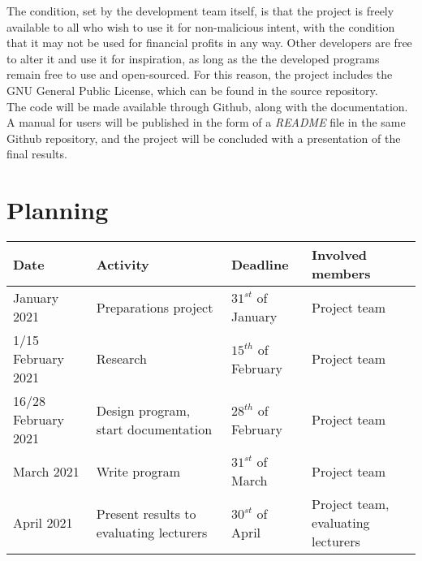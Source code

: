 \documentclass[a4paper,12pt]{article}
\begin{document}
The condition, set by the development team itself, is that the project is freely available to all who wish to use it for non-malicious intent, with the condition that it may not be used for financial profits in any way. Other developers are free to alter it and use it for inspiration, as long as the the developed programs remain free to use and open-sourced. For this reason, the project includes the GNU General Public License, which can be found in the source repository.\\

The code will be made available through Github, along with the documentation. A manual for users will be published in the form of a \textit{README} file in the same Github repository, and the project will be concluded with a presentation of the final results.

\section{Planning}

\begin{center}
  \begin{tabular}{||m{2cm} || m{4cm} || m{3cm} || m{3.5cm}||} 
    \hline
    Date & Activity & Deadline & Involved members \\ [0.5ex] 
    \hline\hline
    January 2021 & Preparations project & $31^{st}$ of January & Project team \\ 
    \hline
    1/15 February 2021 & Research & $15^{th}$ of February & Project team \\
    \hline
    16/28 February 2021 & Design program, start documentation & $28^{th}$ of February & Project team \\
    \hline
    March 2021 & Write program & $31^{st}$ of March & Project team \\
    \hline
    April 2021 & Present results to evaluating lecturers & $30^{st}$ of April & Project team, evaluating lecturers \\ [1ex] 
    \hline
  \end{tabular}
\end{center}
\end{document}
